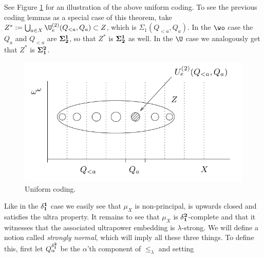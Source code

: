 
See Figure \ref{fig.coding2} for an illustration of the above uniform coding. To see the previous coding lemmas as a special case of this theorem, take $Z^*:=\bigcup_{a\in X}\U^{(2)}_e(Q_{<a},Q_a)\subset Z$, which is $\Sigma_1(Q_{<a},Q_a)$. In the $\wo$ case the $Q_a$ and $Q_{<a}$ are $\bf\Sigma^1_2$, so that $Z^*$ is $\bf\Sigma^1_2$ as well. In the $\U$ case we analogously get that $Z^*$ is $\bf\Sigma^2_1$.

\begin{figure}
	\label{fig.coding2}
	\begin{center}
		\includegraphics[scale=0.5]{coding2.png}
		\caption{Uniform coding.}
	\end{center}
\end{figure}

Like in the $\bf\delta^1_1$ case we easily see that $\mu_X$ is non-principal, is upwards closed and satisfies the ultra property. It remains to see that $\mu_X$ is $\bf\delta^2_1$-complete and that it witnesses that the associated ultrapower embedding is $\lambda$-strong. We will define a notion called \textit{strongly normal}, which will imply all these three things. To define this, first let $Q_\alpha^{\bf\delta^2_1}$ be the $\alpha$'th component of $\leq_\lambda$ and setting

